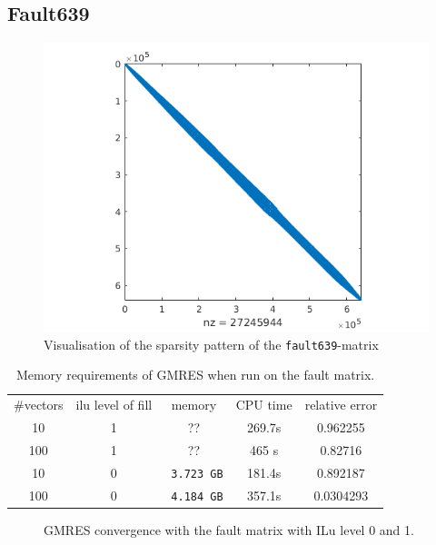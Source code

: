 \subsection{Fault639}
\begin{figure}
\centering
\includegraphics[width=0.7\linewidth]{../src/figure/Fault}
\caption{Visualisation of the sparsity pattern of the \texttt{fault639}-matrix}
\label{fig:fault}
\end{figure}
\begin{table}
\centering
\begin{tabular}{|c|c|c|c|c|} \hline
  \#vectors & ilu level of fill & memory & CPU time & relative error \\
   10  & 1  & ?? & 269.7s & 0.962255  \\
   100 & 1  & ?? & 465 s  & 0.82716  \\
   10  & 0  & \texttt{ 3.723 GB} & 181.4s & 0.892187  \\
   100 & 0  & \texttt{ 4.184 GB} & 357.1s & 0.0304293  \\ \hline
\end{tabular}
\caption{Memory requirements of GMRES when run on the fault matrix. }
\label{tab:FaultGMRES}
\end{table}
\begin{figure}
\centering

\caption{GMRES convergence with the fault matrix with ILu level 0 and 1.}
\label{fig:faultConvergence}
\end{figure}
